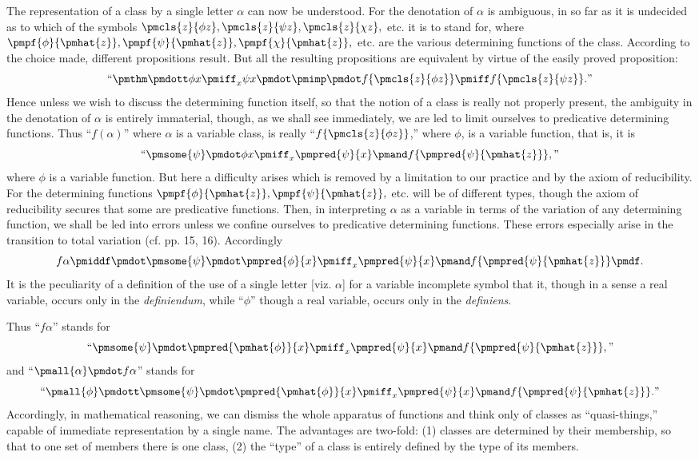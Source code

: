 \documentclass[letterpaper,12pt,openany,leqno]{book}
\newcommand{\pagefirst}[1]{\marginnote[\boxed{\text{#1}}]{\boxed{\text{#1}}}}
\begin{document}
\pagefirst{84} The representation of a class by a single letter $\alpha$ can now be understood. For the denotation of $\alpha$ is ambiguous, in so far as it is undecided as to which of the symbols $\pmcls{z}{\phi z}, \pmcls{z}{\psi z}, \pmcls{z}{\chi z},$ etc. it is to stand for, where $\pmpf{\phi}{\pmhat{z}},\pmpf{\psi}{\pmhat{z}},\pmpf{\chi}{\pmhat{z}},$ etc. are the various determining functions of the class. According to the choice made, different propositions result. But all the resulting propositions are equivalent by virtue of the easily proved proposition:
\[
	\text{``} \pmthm \pmdott \phi x \pmiff_x \psi x \pmdot \pmimp \pmdot f\{\pmcls{z}{\phi z}\} \pmiff f\{\pmcls{z}{\psi z}\}.\text{''}
\]
Hence unless we wish to discuss the determining function itself, so that the notion of a class is really not properly present, the ambiguity in the denotation of $\alpha$ is entirely immaterial, though, as we shall see immediately, we are led to limit ourselves to predicative determining functions. Thus ``$f(\alpha)$'' where $\alpha$ is a variable class, is really ``$f\{\pmcls{z}{\phi z}\}$,'' where $\phi$, is a variable function, that is, it is
\[
	\text{``}\pmsome{\psi} \pmdot \phi x \pmiff_x \pmpred{\psi}{x} \pmand f\{\pmpred{\psi}{\pmhat{z}}\},\text{''}
\]
where $\phi$ is a variable function. But here a difficulty arises which is removed by a limitation to our practice and by the axiom of reducibility. For the determining functions $\pmpf{\phi}{\pmhat{z}},\pmpf{\psi}{\pmhat{z}},$ etc. will be of different types, though the axiom of reducibility secures that some are predicative functions. Then, in interpreting $\alpha$ as a variable in terms of the variation of any determining function, we shall be led into errors unless we confine ourselves to predicative determining functions. These errors especially arise in the transition to total variation (cf. pp. 15, 16). Accordingly
\[
	f\alpha \pmiddf \pmdot \pmsome{\psi} \pmdot \pmpred{\phi}{x} \pmiff_x \pmpred{\psi}{x} \pmand f\{\pmpred{\psi}{\pmhat{z}}\} \pmdf.
\]
It is the peculiarity of a definition of the use of a single letter [viz. $\alpha$] for a variable incomplete symbol that it, though in a sense a real variable, occurs only in the \textit{definiendum}, while ``$\phi$'' though a real variable, occurs only in the \textit{definiens}. 

Thus ``$f\alpha$'' stands for
\[
	\text{``}\pmsome{\psi} \pmdot \pmpred{\pmhat{\phi}}{x} \pmiff_x \pmpred{\psi}{x} \pmand f\{\pmpred{\psi}{\pmhat{z}}\},\text{''}
\]
and ``$\pmall{\alpha} \pmdot f\alpha$'' stands for
\[ 
	\text{``}\pmall{\phi} \pmdott \pmsome{\psi} \pmdot \pmpred{\pmhat{\phi}}{x} \pmiff_x \pmpred{\psi}{x} \pmand f\{\pmpred{\psi}{\pmhat{z}}\}.\text{''}
\]
Accordingly, in mathematical reasoning, we can dismiss the whole apparatus of functions and think only of classes as ``quasi-things,'' capable of immediate representation by a single name. The advantages are two-fold: (1) classes are determined by their membership, so that to one set of members there is one class, (2) the ``type'' of a class is entirely defined by the type of its members. 
\end{document}
